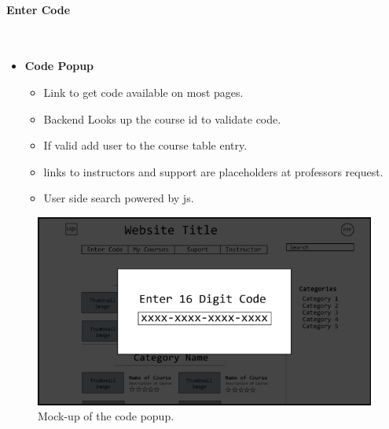 \documentclass{article}
\begin{document}
\paragraph{Enter Code}\\
\begin{itemize}
    \item \textbf{Code Popup}
        \begin{itemize}
        \item Link to get code available on most pages.
        \item Backend Looks up the course id to validate code.
        \item If valid add user to the course table entry.
        \item links to instructors and support are placeholders at professors request.
        \item User side search powered by js.
    \end{itemize}
\end{itemize}
\begin{figure}[h!]
    \caption{Mock-up of the code popup.}
    \includegraphics[width=\textwidth]{enter_code}
\end{figure}

\newpage
\end{document}
